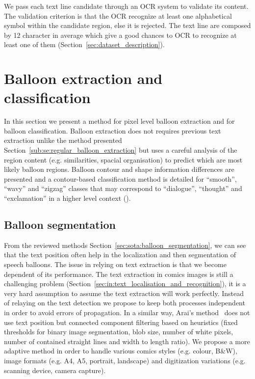 We pass each text line candidate through an OCR system to validate its content.
The validation criterion is that the OCR recognize at least one alphabetical symbol within the candidate region, else it is rejected.
The text line are composed by 12 character in average which give a good chances to OCR to recognize at least one of them (Section~\ref{sec:dataset_description}).




\section{Balloon extraction and classification}
\label{sec:in:balloon}

In this section we present a method for pixel level balloon extraction and for balloon classification.
Balloon extraction does not requires previous text extraction unlike the method presented Section~\ref{sub:se:regular_balloon_extraction} but uses a careful analysis of the region content (e.g. similarities, spacial organisation) to predict which are most likely balloon regions.
Balloon contour and shape information differences are presented and a contour-based classification method is detailed for ``smooth'', ``wavy'' and ``zigzag'' classes that may correspond to ``dialogue'', ``thought'' and ``exclamation'' in a higher level context ().

\subsection{Balloon segmentation} %
\label{sub:in:balloon_segmentation}
From the reviewed methods Section~\ref{sec:sota:balloon_segmentation}, we can see that the text position often help in the localization and then segmentation of speech balloons.
The issue in relying on text extraction is that we become dependent of its performance.
The text extraction in comics images is still a challenging problem (Section~\ref{sec:in:text_localisation_and_recognition}), it is a very hard assumption to assume the text extraction will work perfectly. 
Instead of relaying on the text detection we propose to keep both processes independent in order to avoid errors of propagation.
In a similar way, Arai's method~\cite{Arai11} does not use text position but connected component filtering based on heuristics (fixed thresholds for binary image segmentation, blob size, number of white pixels, number of contained straight lines and width to length ratio). 
We propose a more adaptive method in order to handle various comics styles (e.g. colour, B\&W), image formats (e.g. A4, A5, portrait, landscape) and digitization variations (e.g. scanning device, camera capture).

